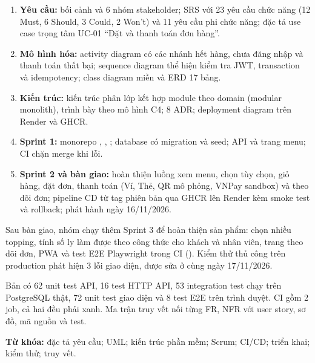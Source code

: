 \begin{enumerate}
\item \textbf{Yêu cầu:} bối cảnh và 6 nhóm stakeholder; SRS với 23 yêu cầu chức năng (12 Must, 6 Should, 3 Could, 2 Won't) và 11 yêu cầu phi chức năng; đặc tả use case trọng tâm UC-01 ``Đặt và thanh toán đơn hàng''.
\item \textbf{Mô hình hóa:} activity diagram có các nhánh hết hàng, chưa đăng nhập và thanh toán thất bại; sequence diagram thể hiện kiểm tra JWT, transaction và idempotency; class diagram miền và ERD 17 bảng.
\item \textbf{Kiến trúc:} kiến trúc phân lớp kết hợp module theo domain (modular monolith), trình bày theo mô hình C4; 8 ADR; deployment diagram trên Render và GHCR.
\item \textbf{Sprint 1:} monorepo , , ; database có migration và seed; API và trang menu; CI chặn merge khi lỗi.
\item \textbf{Sprint 2 và bàn giao:} hoàn thiện luồng xem menu, chọn tùy chọn, giỏ hàng, đặt đơn, thanh toán (Ví, Thẻ, QR mô phỏng, VNPay sandbox) và theo dõi đơn; pipeline CD từ tag phiên bản qua GHCR lên Render kèm smoke test và rollback; phát hành  ngày 16/11/2026.
\end{enumerate}

Sau bàn giao, nhóm chạy thêm Sprint 3 để hoàn thiện sản phẩm: chọn nhiều topping, tính số ly làm được theo công thức cho khách và nhân viên, trang theo dõi đơn, PWA và test E2E Playwright trong CI (). Kiểm thử thủ công trên production phát hiện 3 lỗi giao diện, được sửa ở  cùng ngày 17/11/2026.

Bản  có 62 unit test API, 16 test HTTP API, 53 integration test chạy trên PostgreSQL thật, 72 unit test giao diện và 8 test E2E trên trình duyệt. CI gồm 2 job, cả hai đều phải xanh. Ma trận truy vết nối từng FR, NFR với user story, sơ đồ, mã nguồn và test.

\vspace{6pt}
\noindent\textbf{Từ khóa:} đặc tả yêu cầu; UML; kiến trúc phần mềm; Scrum; CI/CD; triển khai; kiểm thử; truy vết.

\clearpage
